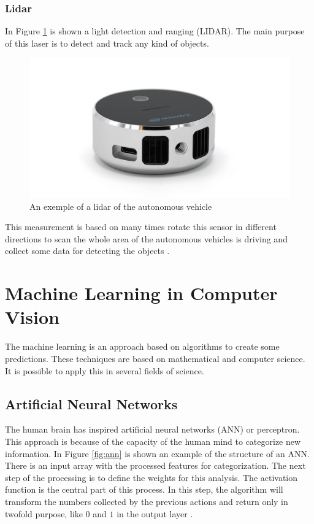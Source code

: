 \subsubsection{Lidar}\label{sub:lidar}
In Figure \ref{fig:lidar} is shown a light detection and ranging (LIDAR). The main purpose of this laser is to detect and track any kind of objects. 
\begin{figure}[H]
\centering
\includegraphics[width=\columnwidth]{imagens/lidar.jpg}
\caption{An exemple of a lidar of the autonomous vehicle}
\label{fig:lidar}
\end{figure}

This measurement is based on many times rotate this sensor in different directions to scan the whole area of the autonomous vehicles is driving and collect some data for detecting the objects \cite{gao2018object}.

\section{Machine Learning in Computer Vision}\label{ml-ai}
The machine learning is an approach based on algorithms to create some predictions. These techniques are based on mathematical and computer science. It is possible to apply this in several fields of science. 
\subsection{Artificial Neural Networks}

The human brain has inspired artificial neural networks (ANN) or perceptron. This approach is because of the capacity of the human mind to categorize new information. In Figure \ref{fig:ann} is shown an example of the structure of an ANN. There is an input array with the processed features for categorization. The next step of the processing is to define the weights for this analysis. The activation function is the central part of this process. In this step, the algorithm will transform the numbers collected by the previous actions and return only in twofold purpose, like $0$ and $1$ in the output layer \cite{goodfellow2016deep}.

